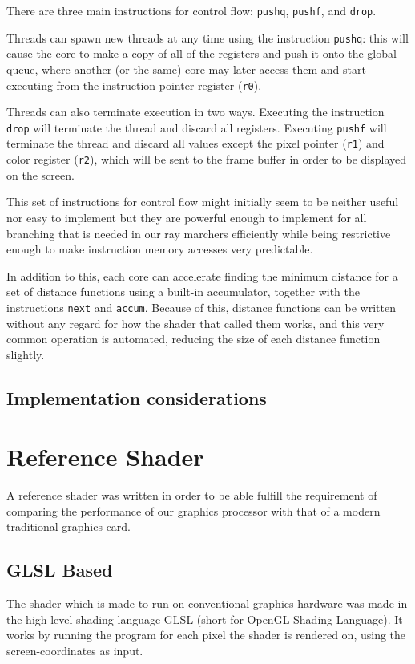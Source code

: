 			There are three main instructions for control flow: \texttt{pushq},
			\texttt{pushf}, and \texttt{drop}. 
			
			Threads can spawn new threads at any time using the instruction
			\texttt{pushq}: this will cause the core to make a copy of all of
			the registers and push it onto the global queue, where another (or
			the same) core may later access them and start executing from the
			instruction pointer register (\texttt{r0}).
			
			Threads can also terminate execution in two ways. Executing the
			instruction \texttt{drop} will terminate the thread and discard all
			registers. Executing \texttt{pushf} will terminate the thread and
			discard all values except the pixel pointer (\texttt{r1}) and color
			register (\texttt{r2}), which will be sent to the frame buffer in
			order to be displayed on the screen.
	
			This set of instructions for control flow might initially seem to
			be neither useful nor easy to implement but they are powerful
			enough to implement for all branching that is needed in our ray
			marchers efficiently while being restrictive enough to make
			instruction memory accesses very predictable.

			In addition to this, each core can accelerate finding the minimum 
			distance for a set of distance functions using a built-in 
			accumulator, together with the instructions \texttt{next} and 
			\texttt{accum}. Because of this, distance functions can be written
			without any regard for how the shader that called them works, and
			this very common operation is automated, reducing the size of each
			distance function slightly.
		
		\subsection{Implementation considerations}
	
	\section{Reference Shader} \label{implshader}
		
		A reference shader was written in order to be able fulfill the
		requirement of comparing the performance of our graphics processor with
		that of a modern traditional graphics card. 
	
		\subsection{GLSL Based}
			The shader which is made to run on conventional graphics hardware
			was made in the high-level shading language GLSL (short for 
			OpenGL Shading Language). It works by running the program for
			each pixel the shader is rendered on, using the screen-coordinates 
			as input.

